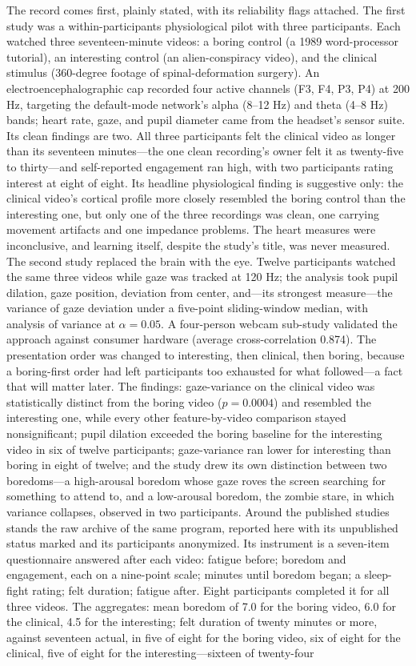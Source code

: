\documentclass{article}
\begin{document}
The record comes first, plainly stated, with its reliability flags attached. The first study was a within-participants physiological pilot with three participants. Each watched three seventeen-minute videos: a boring control (a 1989 word-processor tutorial), an interesting control (an alien-conspiracy video), and the clinical stimulus (360-degree footage of spinal-deformation surgery). An electroencephalographic cap recorded four active channels (F3, F4, P3, P4) at 200 Hz, targeting the default-mode network's alpha (8--12 Hz) and theta (4--8 Hz) bands; heart rate, gaze, and pupil diameter came from the headset's sensor suite. Its clean findings are two. All three participants felt the clinical video as longer than its seventeen minutes---the one clean recording's owner felt it as twenty-five to thirty---and self-reported engagement ran high, with two participants rating interest at eight of eight. Its headline physiological finding is suggestive only: the clinical video's cortical profile more closely resembled the boring control than the interesting one, but only one of the three recordings was clean, one carrying movement artifacts and one impedance problems. The heart measures were inconclusive, and learning itself, despite the study's title, was never measured. The second study replaced the brain with the eye. Twelve participants watched the same three videos while gaze was tracked at 120 Hz; the analysis took pupil dilation, gaze position, deviation from center, and---its strongest measure---the variance of gaze deviation under a five-point sliding-window median, with analysis of variance at $\alpha = 0.05$. A four-person webcam sub-study validated the approach against consumer hardware (average cross-correlation 0.874). The presentation order was changed to interesting, then clinical, then boring, because a boring-first order had left participants too exhausted for what followed---a fact that will matter later. The findings: gaze-variance on the clinical video was statistically distinct from the boring video ($p = 0.0004$) and resembled the interesting one, while every other feature-by-video comparison stayed nonsignificant; pupil dilation exceeded the boring baseline for the interesting video in six of twelve participants; gaze-variance ran lower for interesting than boring in eight of twelve; and the study drew its own distinction between two boredoms---a high-arousal boredom whose gaze roves the screen searching for something to attend to, and a low-arousal boredom, the zombie stare, in which variance collapses, observed in two participants. Around the published studies stands the raw archive of the same program, reported here with its unpublished status marked and its participants anonymized. Its instrument is a seven-item questionnaire answered after each video: fatigue before; boredom and engagement, each on a nine-point scale; minutes until boredom began; a sleep-fight rating; felt duration; fatigue after. Eight participants completed it for all three videos. The aggregates: mean boredom of 7.0 for the boring video, 6.0 for the clinical, 4.5 for the interesting; felt duration of twenty minutes or more, against seventeen actual, in five of eight for the boring video, six of eight for the clinical, five of eight for the interesting---sixteen of twenty-four 
\end{document}
